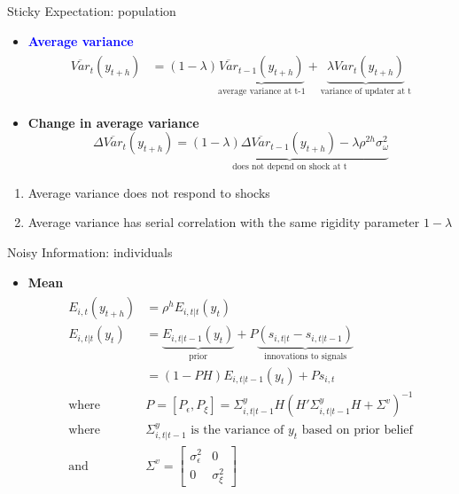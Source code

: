 \documentclass{beamer}
\begin{document}
\begin{frame}{Sticky Expectation: population}
\begin{itemize}
\item \textcolor{blue}{\textbf{Average variance}}
\begin{eqnarray*}
\begin{aligned}
	\overline {Var}_{t}(y_{t+h}) &  =  (1-\lambda)\underbrace{\overline {Var}_{t-1}(y_{t+h})}_{\text{average variance at t-1}} + \underbrace{\lambda Var_{t}(y_{t+h})}_{\text{variance of updater at t} }
\end{aligned}
\end{eqnarray*}
\item \textbf{Change in average variance}
$$\Delta \overline {Var}_{t}(y_{t+h}) = \underbrace{(1-\lambda)\Delta \overline {Var}_{t-1}(y_{t+h}) - \lambda \rho^{2h}\sigma^2_{\omega}}_{\text{does not depend on shock at t}}$$
\end{itemize}

\begin{enumerate}
\item Average variance does not respond to shocks
\item Average variance has serial correlation with the same rigidity parameter $1-\lambda$ 
\end{enumerate}

\end{frame}


\begin{frame}{Noisy Information: individuals}
\begin{itemize}
	\item \textbf{Mean}
	\begin{eqnarray*}
		\begin{aligned}
			E_{i,t}(y_{t+h}) & = \rho^{h}E_{i,t|t}(y_{t}) \\
			E_{i,t|t}(y_{t}) 
			& =  \underbrace{E_{i,t|t-1}(y_{t})}_{\text{prior}} + P \underbrace {(s_{i,t|t}-s_{i,t|t-1})}_{\text{innovations to signals}} \\
			& = (1-PH) E_{i,t|t-1}(y_{t}) + Ps_{i,t} \\
			\text{where }  & P = [P_\epsilon,P_\xi]= \Sigma^y_{i,t|t-1} H(H'\Sigma^y_{i,t|t-1} H + \Sigma^v)^{-1} \\
			\text {where } & \Sigma^y_{i,t|t-1} \text{ is the variance of } y_t \text{ based on prior belief}\\
			\text {and } & \Sigma^v =  \left[ \begin{matrix} 
				\sigma^2_{\epsilon} &  0 \\ 0 & \sigma^2_\xi \end{matrix}\right] 
		\end{aligned}
	\end{eqnarray*}
\end{itemize}
\end{frame}
\end{document}
